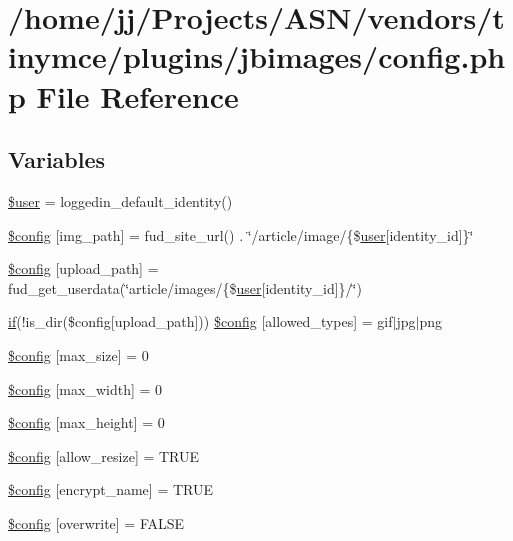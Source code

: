 \hypertarget{config_8php}{}\section{/home/jj/\+Projects/\+A\+S\+N/vendors/tinymce/plugins/jbimages/config.php File Reference}
\label{config_8php}
\subsection*{Variables}
\begin{DoxyCompactItemize}
\item 
\hyperlink{config_8php_a598ca4e71b15a1313ec95f0df1027ca5}{\$user} = loggedin\+\_\+default\+\_\+identity()
\item 
\hyperlink{config_8php_a3fb5345aad792cecf59950f0aeb80d3c}{\$config} \mbox{[}\textquotesingle{}img\+\_\+path\textquotesingle{}\mbox{]} = fud\+\_\+site\+\_\+url() . \char`\"{}/article/image/\{\$\hyperlink{ossn_8config_8db_8example_8php_a802544b7ba9f79bbf24ef67773d53bed}{user}\mbox{[}\textquotesingle{}identity\+\_\+id\textquotesingle{}\mbox{]}\}\char`\"{}
\item 
\hyperlink{config_8php_aed4396bce8ab87ece253ce0e9965669b}{\$config} \mbox{[}\textquotesingle{}upload\+\_\+path\textquotesingle{}\mbox{]} = fud\+\_\+get\+\_\+userdata(\char`\"{}article/images/\{\$\hyperlink{ossn_8config_8db_8example_8php_a802544b7ba9f79bbf24ef67773d53bed}{user}\mbox{[}\textquotesingle{}identity\+\_\+id\textquotesingle{}\mbox{]}\}/\char`\"{})
\item 
\hyperlink{jquery_8tokeninput_8js_ad8dd46a3cbc004569e34401e9e71771a}{if}(!is\+\_\+dir(\$config\mbox{[}\textquotesingle{}upload\+\_\+path\textquotesingle{}\mbox{]})) \hyperlink{config_8php_a512ef03098d9904d1cf283e30737fea3}{\$config} \mbox{[}\textquotesingle{}allowed\+\_\+types\textquotesingle{}\mbox{]} = \textquotesingle{}gif$\vert$jpg$\vert$png\textquotesingle{}
\item 
\hyperlink{config_8php_a08ef9a43e1ca734499df35a4e9a77e49}{\$config} \mbox{[}\textquotesingle{}max\+\_\+size\textquotesingle{}\mbox{]} = 0
\item 
\hyperlink{config_8php_a27019f4fc442fa2b86b4477ab220a062}{\$config} \mbox{[}\textquotesingle{}max\+\_\+width\textquotesingle{}\mbox{]} = 0
\item 
\hyperlink{config_8php_a3b7844b3d06123a510c1cc1bd6225fe5}{\$config} \mbox{[}\textquotesingle{}max\+\_\+height\textquotesingle{}\mbox{]} = 0
\item 
\hyperlink{config_8php_a37f0f0a570e5355ebe3cf54b961d88be}{\$config} \mbox{[}\textquotesingle{}allow\+\_\+resize\textquotesingle{}\mbox{]} = T\+R\+UE
\item 
\hyperlink{config_8php_a68ed88b056af10f4a497cd806017c0c5}{\$config} \mbox{[}\textquotesingle{}encrypt\+\_\+name\textquotesingle{}\mbox{]} = T\+R\+UE
\item 
\hyperlink{config_8php_a90847191a70a5f5968f94903fdc6311b}{\$config} \mbox{[}\textquotesingle{}overwrite\textquotesingle{}\mbox{]} = F\+A\+L\+SE
\end{DoxyCompactItemize}


